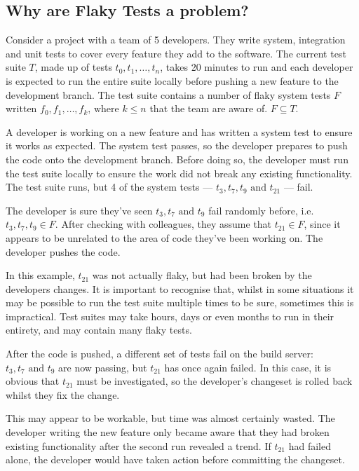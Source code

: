 \subsection{Why are Flaky Tests a problem?}

Consider a project with a team of 5 developers. They write system, integration and unit tests to cover every feature they add to the software. The current test suite $T$, made up of tests $t_{0}, t_{1}, \dots, t_{n}$, takes 20 minutes to run and each developer is expected to run the entire suite locally before pushing a new feature to the development branch. The test suite contains a number of flaky system tests $F$ written $f_{0}, f_{1}, \dots, f_{k} \text{, where $k \leq n$}$ that the team are aware of. $F \subseteq T$.

A developer is working on a new feature and has written a system test to ensure it works as expected. The system test passes, so the developer prepares to push the code onto the development branch. Before doing so, the developer must run the test suite locally to ensure the work did not break any existing functionality. The test suite runs, but 4 of the system tests --- $t_{3}, t_{7}, t_{9} \text{ and } t_{21}$ --- fail.

The developer is sure they’ve seen $t_{3}, t_{7} \text{ and } t_{9}$ fail randomly before, i.e. $t_{3}, t_{7}, t_{9} \in F$. After checking with colleagues, they assume that $t_{21} \in F$, since it appears to be unrelated to the area of code they’ve been working on. The developer pushes the code.

In this example, $t_{21}$ was not actually flaky, but had been broken by the developers changes. It is important to recognise that, whilst in some situations it may be possible to run the test suite multiple times to be sure, sometimes this is impractical. Test suites may take hours, days or even months to run in their entirety, and may contain many flaky tests.

After the code is pushed, a different set of tests fail on the build server: $t_{3}, t_{7} \text{ and } t_{9}$ are now passing, but $t_{21}$ has once again failed. In this case, it is obvious that $t_{21}$ must be investigated, so the developer’s changeset is rolled back whilst they fix the change.

This may appear to be workable, but time was almost certainly wasted. The developer writing the new feature only became aware that they had broken existing functionality after the second run revealed a trend. If $t_{21}$ had failed alone, the developer would have taken action before committing the changeset.

